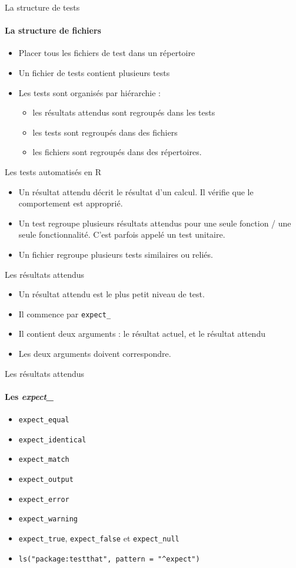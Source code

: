 \documentclass[11pt]{beamer}
\begin{document}
\begin{frame}{La structure de tests}
\framesubtitle{La structure de fichiers}
\begin{itemize}
\item Placer tous les fichiers de test dans un répertoire
\item Un fichier de tests contient plusieurs tests
\item Les tests sont organisés par hiérarchie :
\begin{itemize}
    \item les résultats attendus sont regroupés dans les tests
    \item les tests sont regroupés dans des fichiers
    \item les fichiers sont regroupés dans des répertoires.
\end{itemize}
\end{itemize}
\end{frame}

\begin{frame}{Les tests automatisés en R}
\begin{itemize}
\item Un résultat attendu décrit le résultat d'un calcul. Il vérifie que le comportement est approprié.
\item Un test regroupe plusieurs résultats attendus pour une seule fonction / une seule fonctionnalité. C'est parfois appelé un test unitaire.
\item Un fichier regroupe plusieurs tests similaires ou reliés.
\end{itemize}
\end{frame}

\begin{frame}{Les résultats attendus}
\begin{itemize}
\item Un résultat attendu est le plus petit niveau de test.
\item Il commence par \texttt{expect\_}
\item Il contient deux arguments : le résultat actuel, et le résultat attendu
\item Les deux arguments doivent correspondre.
\end{itemize}
\end{frame}

\begin{frame}{Les résultats attendus}
\framesubtitle{Les \emph{expect\_}}
\begin{itemize}
\item \texttt{expect\_equal}
\item \texttt{expect\_identical}
\item \texttt{expect\_match}
\item \texttt{expect\_output}
\item \texttt{expect\_error}
\item \texttt{expect\_warning}
\item \texttt{expect\_true}, \texttt{expect\_false} et \texttt{expect\_null}
\item \texttt{ls("package:testthat", pattern = "\^{}expect")}
\end{itemize}
\end{frame}
\end{document}
